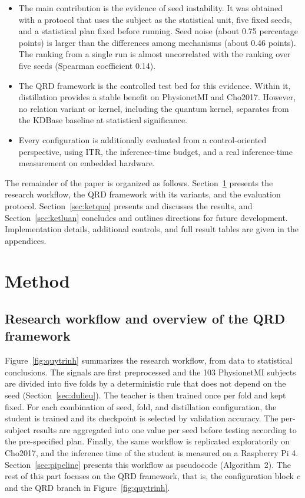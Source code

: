\begin{itemize}
\item The main contribution is the evidence of seed instability. It was
obtained with a protocol that uses the subject as the statistical unit,
five fixed seeds, and a statistical plan fixed before running. Seed noise
(about 0.75 percentage points) is larger than the differences among
mechanisms (about 0.46 points). The ranking from a single run is almost
uncorrelated with the ranking over five seeds (Spearman coefficient 0.14).

\item The QRD framework is the controlled test bed for this evidence.
Within it, distillation provides a stable benefit on PhysionetMI and
Cho2017. However, no relation variant or kernel, including the quantum
kernel, separates from the KDBase baseline at statistical significance.

\item Every configuration is additionally evaluated from a
control-oriented perspective, using ITR, the inference-time budget, and a
real inference-time measurement on embedded hardware.
\end{itemize}

The remainder of the paper is organized as follows.
Section~\ref{sec:phuongphap} presents the research workflow, the QRD
framework with its variants, and the evaluation protocol.
Section~\ref{sec:ketqua} presents and discusses the results, and
Section~\ref{sec:ketluan} concludes and outlines directions for future
development. Implementation details, additional controls, and
full result tables are given in the appendices.

\section{Method}
\label{sec:phuongphap}

\subsection{Research workflow and overview of the QRD framework}
\label{sec:tongquan}

Figure~\ref{fig:quytrinh} summarizes the research workflow, from data
to statistical conclusions. The signals are first preprocessed and the
103 PhysionetMI subjects are divided into five folds by a deterministic
rule that does not depend on the seed (Section~\ref{sec:dulieu}). The
teacher is then trained once per fold and kept fixed. For each
combination of seed, fold, and distillation configuration, the student
is trained and its checkpoint is selected by validation accuracy. The
per-subject results are aggregated into one value per seed before
testing according to the pre-specified plan. Finally, the same workflow
is replicated exploratorily on Cho2017, and the inference time of the
student is measured on a Raspberry Pi 4. Section~\ref{sec:pipeline}
presents this workflow as pseudocode (Algorithm~2). The rest of this
part focuses on the QRD framework, that is, the configuration block $c$
and the QRD branch in Figure~\ref{fig:quytrinh}.

